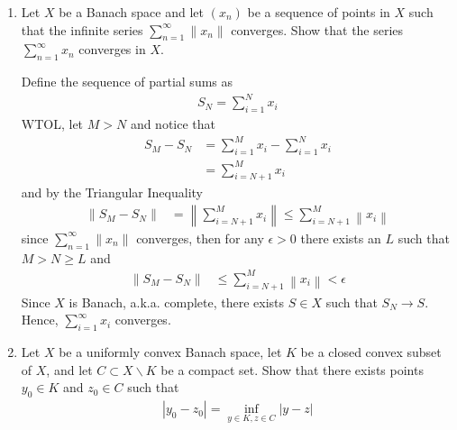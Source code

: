 \documentclass[12pt,a4paper]{report}
\begin{document}
\begin{enumerate}

\newpage
\item Let $X$ be a Banach space and let $(x_n)$ be a sequence of points in $X$ such that the infinite series $\sum_{n=1}^\infty \|x_n\|$ converges.  Show that the series $\sum_{n=1}^\infty x_n$ converges in $X$.

\HLINE
Define the sequence of partial sums as
\begin{align*}
	S_N = \sum_{i=1}^N x_i
\end{align*}WTOL, let $M > N$ and notice that 
\begin{align*}
	S_M - S_N &= \sum_{i=1}^M x_i - \sum_{i=1}^N x_i \\
			&= \sum_{i=N+1}^M x_i
\end{align*} and by the Triangular Inequality
\begin{align*}
	\|S_M - S_N\| &= \left \|\sum_{i=N+1}^M x_i \right\| \le \sum_{i=N+1}^M \left \|x_i\right\| 
\end{align*}since $\sum_{n=1}^\infty \|x_n\|$ converges, then for any $\epsilon > 0$ there exists an $L$ such that $M > N \ge L$ and
\begin{align*}
	\|S_M - S_N\| &\le \sum_{i=N+1}^M \left \|x_i\right\| < \epsilon 
\end{align*}Since $X$ is Banach, a.k.a. complete, there exists $S \in X$ such that $S_N \to S$.  Hence, $\sum_{i=1}^\infty x_i$ converges.

\newpage
\item Let $X$ be a uniformly convex Banach space, let $K$ be a closed convex subset of $X$, and let $C \subset X\backslash K$ be a compact set. Show that there exists points $y_0\in K$ and $z_0\in C$ such that
\begin{align*}
	|y_0-z_0| = \inf_{y\in K,z\in C} |y-z|
\end{align*}

\HLINE

\begin{description}


\end{description}
\end{enumerate}
\end{document}
